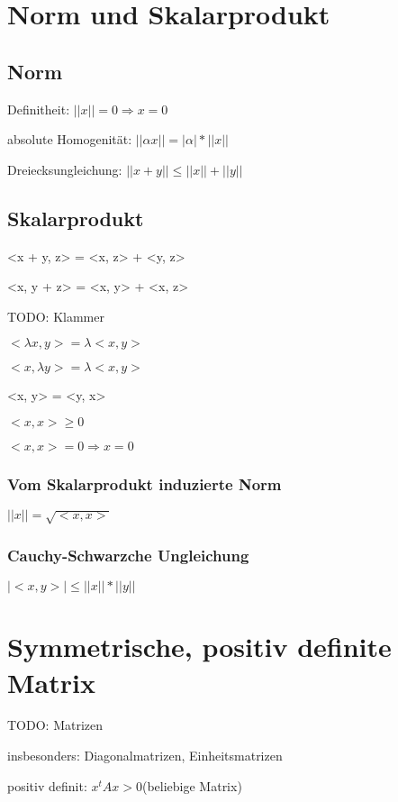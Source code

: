 \documentclass[12pt,a4paper]{article} %
\begin{document}
	\tableofcontents %
	\newpage %
	\section{Norm und Skalarprodukt}
		\subsection{Norm}
		Definitheit: $||x|| = 0 \Rightarrow x = 0$
			
		absolute Homogenität: $||\alpha x|| = |\alpha| * ||x||$
		
		Dreiecksungleichung: $||x + y|| \le ||x|| + ||y||$
		
		\subsection{Skalarprodukt}
		<x + y, z> = <x, z> + <y, z>
		
		<x, y + z> = <x, y> + <x, z>
		
		TODO: Klammer
		
		$<\lambda x, y> = \lambda <x, y>$
		
		$<x, \lambda y> = \lambda <x, y>$
		
		<x, y> = <y, x>
		
		$<x, x> \ge 0$
		
		$<x, x> = 0 \Rightarrow x = 0$
		
		
		\subsubsection{Vom Skalarprodukt induzierte Norm}
		$||x|| = \sqrt{<x, x>}$
		
		\subsubsection{Cauchy-Schwarzche Ungleichung}
		$|<x, y>| \le ||x||*||y||$
		
		\newpage
		
		\section{Symmetrische, positiv definite Matrix}
		TODO: Matrizen
		
		insbesonders: Diagonalmatrizen, Einheitsmatrizen
		
		positiv definit: $x^t Ax > 0 $(beliebige Matrix)
		
\end{document}
